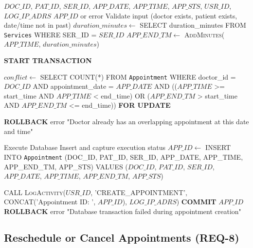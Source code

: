 \begin{algorithm}[H]
	\caption{Create Appointment (Race-Condition Free)}
	\label{alg:create-appointment}
	\begin{algorithmic}[1]
		\REQUIRE $DOC\_ID$, $PAT\_ID$, $SER\_ID$, $APP\_DATE$, $APP\_TIME$, $APP\_STS$, $USR\_ID$, $LOG\_IP\_ADRS$
		\ENSURE $APP\_ID$ or error
		\STATE Validate input (doctor exists, patient exists, date/time not in past)
		\STATE $duration\_minutes \leftarrow$ SELECT duration\_minutes FROM \texttt{Services} WHERE SER\_ID = $SER\_ID$
		\STATE $APP\_END\_TM \leftarrow$ \textsc{AddMinutes}($APP\_TIME$, $duration\_minutes$)
		
		\STATE \textbf{START TRANSACTION} 
		
		\STATE {}
		\STATE $conflict \leftarrow$ SELECT COUNT(*) FROM \texttt{Appointment} 
		WHERE doctor\_id = $DOC\_ID$
		AND appointment\_date = $APP\_DATE$
		AND (($APP\_TIME$ >= start\_time AND $APP\_TIME$ < end\_time) 
		OR ($APP\_END\_TM$ > start\_time AND $APP\_END\_TM$ <= end\_time))
		\textbf{FOR UPDATE}
		
		\STATE \textbf{ROLLBACK}
		\RETURN error "Doctor already has an overlapping appointment at this date and time"
		\ENDIF
		
		\STATE Execute Database Insert and capture execution status
		\STATE $APP\_ID \leftarrow$ INSERT INTO \texttt{Appointment} (DOC\_ID, PAT\_ID, SER\_ID, APP\_DATE, APP\_TIME, APP\_END\_TM, APP\_STS) VALUES ($DOC\_ID$, $PAT\_ID$, $SER\_ID$, $APP\_DATE$, $APP\_TIME$, $APP\_END\_TM$, $APP\_STS$)
		
		\STATE CALL \textsc{LogActivity}($USR\_ID$, 'CREATE\_APPOINTMENT', CONCAT('Appointment ID: ', $APP\_ID$), $LOG\_IP\_ADRS$)
		\STATE \textbf{COMMIT} 
		\RETURN $APP\_ID$
		\ELSE
		\STATE \textbf{ROLLBACK} 
		\RETURN error "Database transaction failed during appointment creation"
		\ENDIF
	\end{algorithmic}
\end{algorithm}

\subsection{Reschedule or Cancel Appointments (REQ-8)}

